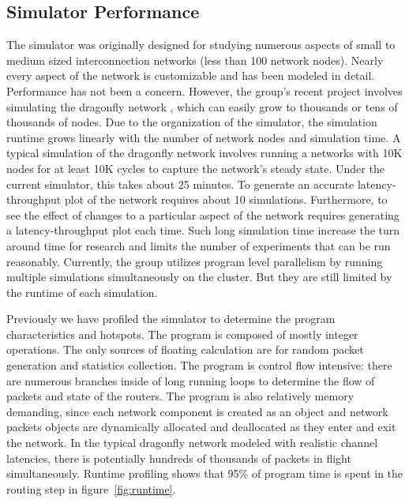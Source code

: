 \subsection{Simulator Performance}
The simulator was originally designed for studying numerous aspects of small to medium sized interconnection networks (less than 100 network nodes). Nearly every aspect of the network is customizable and has been modeled in detail. Performance has not been a concern. However, the group's recent project involves simulating the dragonfly network \cite{cdragon}, which can easily grow to thousands or tens of thousands of nodes. Due to the organization of the simulator, the simulation runtime grows linearly with the number of network nodes and simulation time. A typical simulation of the dragonfly network involves running a networks with 10K nodes for at least 10K cycles to capture the network's steady state. Under the current simulator, this takes about 25 minutes. To generate an accurate latency-throughput plot of the network requires about 10 simulations. Furthermore, to see the effect of changes to a particular aspect of the network requires generating a latency-throughput plot each time. Such long simulation time increase the turn around time for research and limits the number of experiments that can be run reasonably. Currently, the group utilizes program level parallelism by running multiple simulations simultaneously on the cluster. But they are still limited by the runtime of each simulation.

Previously we have profiled the simulator to determine the program characteristics and hotspots. The program is composed of mostly integer operations. The only sources of floating calculation are for random packet generation and statistics collection. The program is control flow intensive: there are numerous branches inside of long running loops to determine the flow of packets and state of the routers. The program is also relatively memory demanding, since each network component is created as an object and network packets objects are dynamically allocated and deallocated as they enter and exit the network. In the typical dragonfly network modeled with realistic channel latencies, there is potentially hundreds of thousands of packets in flight simultaneously. Runtime profiling shows that 95\% of program time is spent in the routing step in figure~\ref{fig:runtime}. 

